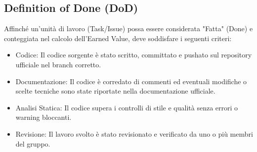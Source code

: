 \documentclass[11pt,a4paper]{article}
\begin{document}
\subsection{Definition of Done (DoD)}
Affinché un'unità di lavoro (Task/Issue) possa essere considerata "Fatta" (Done) e conteggiata nel calcolo dell'Earned Value, deve soddisfare i seguenti criteri:
\begin{itemize} 
    \item Codice: Il codice sorgente è stato scritto, committato e pushato sul repository ufficiale nel branch corretto.
    \item Documentazione: Il codice è corredato di commenti ed eventuali modifiche o scelte tecniche sono state riportate nella documentazione ufficiale.
    \item Analisi Statica: Il codice supera i controlli di stile e qualità senza errori o warning bloccanti. 
    \item Revisione: Il lavoro svolto è stato revisionato e verificato da uno o più membri del gruppo.
\end{itemize}
\end{document}
